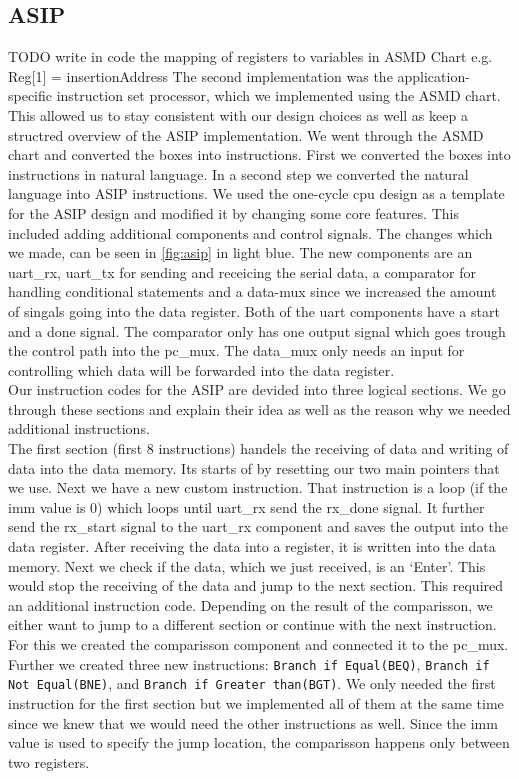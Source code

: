 \documentclass[conference]{IEEEtran}
\begin{document}
\subsection{ASIP}
TODO write in code the mapping of registers to variables in ASMD Chart e.g. Reg[1] = insertionAddress
The second implementation was the application-specific instruction set processor, which we implemented using the ASMD chart. This allowed us to stay consistent with our design choices as well as keep a structred overview of the ASIP implementation. We went through the ASMD chart and converted the boxes into instructions. First we converted the boxes into instructions in natural language. In a second step we converted the natural language into ASIP instructions. We used the one-cycle cpu design as a template for the ASIP design and modified it by changing some core features. This included adding additional components and control signals. The changes which we made, can be seen in \ref{fig:asip} in light blue. The new components are an uart\_rx, uart\_tx for sending and receicing the serial data, a comparator for handling conditional statements and a data-mux since we increased the amount of singals going into the data register. Both of the uart components have a start and a done signal. The comparator only has one output signal which goes trough the control path into the pc\_mux. The data\_mux only needs an input for controlling which data will be forwarded into the data register.\\
Our instruction codes for the ASIP are devided into three logical sections. We go through these sections and explain their idea as well as the reason why we needed additional instructions.\\
The first section (first 8 instructions) handels the receiving of data and writing of data into the data memory. Its starts of by resetting our two main pointers that we use. Next we have a new custom instruction. That instruction is a loop (if the imm value is 0) which loops until uart\_rx send the rx\_done signal. It further send the rx\_start signal to the uart\_rx component and saves the output into the data register. After receiving the data into a register, it is written into the data memory. Next we check if the data, which we just received, is an `Enter'. This would stop the receiving of the data and jump to the next section. This required an additional instruction code. Depending on the result of the comparisson, we either want to jump to a different section or continue with the next instruction. For this we created the comparisson component and connected it to the pc\_mux. Further we created three new instructions: \texttt{Branch if Equal(BEQ)}, \texttt{Branch if Not Equal(BNE)}, and \texttt{Branch if Greater than(BGT)}. We only needed the first instruction for the first section but we implemented all of them at the same time since we knew that we would need the other instructions as well. Since the imm value is used to specify the jump location, the comparisson happens only between two registers.\\
\end{document}
